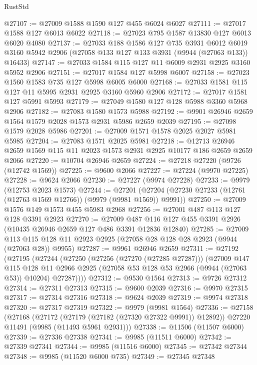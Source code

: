 \begin{lexlean}{RustStd}
\begin{coremodule}
@27107 := @27009 @1588 @1590 @127 @455 @6024 @6027
@27111 := @27017 @1588 @127 @6013 @6022
@27118 := @27023 @795 @1587 @13830 @127 @6013 @6020 @4080
@27137 := @27033
    @188
    @1586
    @127
    @735
    @3931
    @6012
    @6019
    @3160
    @5942
    @2906
    (@27058 @133 @127 @133 @3931 (@9944 (@27063 @133)) @16433)
@27147 := @27033 @1584 @115 @127 @11 @6009 @2931 @2925 @3160 @5952 @2906
@27151 := @27017 @1584 @127 @5998 @6007
@27158 := @27023 @1560 @1583 @735 @127 @5998 @6005 @6000
@27168 := @27033 @1581 @115 @127 @11 @5995 @2931 @2925 @3160 @5960 @2906
@27172 := @27017 @1581 @127 @5991 @5993
@27179 := @27049 @1580 @127 @128 @5988 @3360 @5968 @2906
@27182 := @27083 @1580 @1573 @5988
@27192 := @9901 @26946 @2659 @1564 @1579 @2028 @1573 @2931 @5986 @2659 @2039
@27195 := @27098 @1579 @2028 @5986
@27201 := @27009 @1571 @1578 @2025 @2027 @5981 @5985
@27204 := @27083 @1571 @2025 @5981
@27218 := @12713 @26946 @2659 @1569 @115 @11 @2023 @1573 @2931 @2925 @10177 @186 @2659 @2659 @2066
@27220 := @10704 @26946 @2659
@27224 := @27218 @27220 (@9726 (@12742 @1569))
@27225 := @9600 @2066
@27227 := @27224 (@9970 @27225)
@27228 := @9624 @2066
@27230 := @27227 (@9974 @27228)
@27233 := @9979 (@12753 @2023 @1573)
@27244 := @27201 (@27204 (@27230 @27233 (@12761 (@12763 @1569 @12766)) (@9979 (@9981 @1569)) @9991))
@27250 := @27009 @1576 @149 @1573 @455 @5983 @2968
@27256 := @27001 @487 @113 @127 @128 @3391 @2923
@27270 := @27009 @487 @116 @127 @455 @3391 @2926 (@10435 @26946 @2659 @127 @486 @3391 @12836 @12840)
@27285 := @27009
    @113
    @115
    @128
    @11
    @2923
    @2925
    (@27058 @28 @128 @28 @2923 (@9944 (@27063 @28)) @9955)
@27287 := @9961 @26946 @2659
@27311 := @27192
    (@27195
      (@27244
        (@27250
          (@27256 (@27270 (@27285 @27287)))
          (@27009
            @147
            @115
            @128
            @11
            @2966
            @2925
            (@27058 @53 @128 @53 @2966 (@9944 (@27063 @53)) @10204)
            @27287))))
@27312 := @9530 @1564
@27313 := @9726 @27312
@27314 := @27311 @27313
@27315 := @9600 @2039
@27316 := @9970 @27315
@27317 := @27314 @27316
@27318 := @9624 @2039
@27319 := @9974 @27318
@27320 := @27317 @27319
@27322 := @9979 (@9981 @1564)
@27336 := @27158
    (@27168
      (@27172 (@27179 (@27182 (@27320 @27322 @9991)) @12892))
      @27220
      @11491
      (@9985 (@11493 @5961 @2931)))
@27338 := @11506 (@11507 @6000)
@27339 := @27336 @27338
@27341 := @9985 (@11511 @6000)
@27342 := @27339 @27341
@27344 := @9985 (@11516 @6000)
@27345 := @27342 @27344
@27348 := @9985 (@11520 @6000 @735)
@27349 := @27345 @27348

\end{coremodule}
\end{lexlean}
